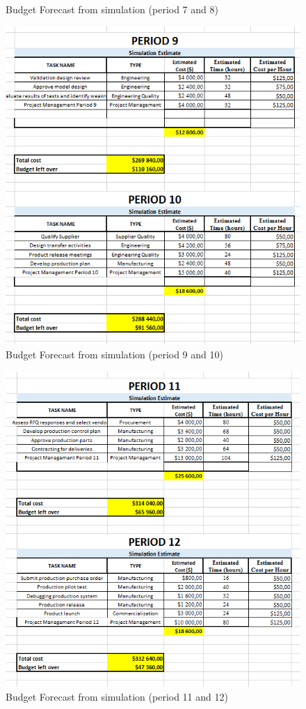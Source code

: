 \begin{appendices}
\begin{figure}[H]
\caption{Budget Forecast from simulation (period 7 and 8)}
\end{figure}
\begin{figure}[H]
\includegraphics[scale=1]{budget_forecast_sim_910.PNG}
\caption{Budget Forecast from simulation (period 9 and 10)}
\end{figure}
\begin{figure}[H]
\includegraphics[scale=1]{budget_forecast_sim_1112.PNG}
\caption{Budget Forecast from simulation (period 11 and 12)}
\end{figure}



\end{appendices}
